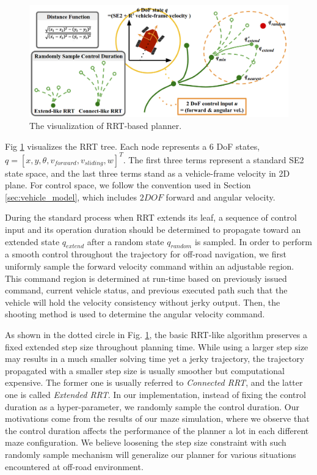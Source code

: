 \documentclass[../thesis.tex]{subfiles}
\begin{document}
\begin{figure}[t]
    	\begin{center}
    	 \centerline{\includegraphics[width=0.8\columnwidth]{./RRTPlanner/fig/rrt.png}}
           	\caption{The visualization of RRT-based planner.}
           	\label{fig:rrt}
    	\end{center}
\end{figure}
 
Fig \ref{fig:rrt} visualizes the RRT tree. Each node represents a $6$ DoF states, $q=[x,y, \theta ,v_{forward}, v_{sliding}, w]^T$. The first three terms represent a standard SE2 state space, and the last three terms stand as a vehicle-frame velocity in 2D plane. For control space, we follow the convention used in Section \ref{sec:vehicle_model}, which includes $2DOF$ forward and angular velocity.
 
During the standard process when RRT extends its leaf, a sequence of control input and its operation duration should be determined to propagate toward an extended state $q_{extend}$ after a random state $q_{random}$ is sampled.
In order to perform a smooth control throughout the trajectory for off-road navigation, we first uniformly sample the forward velocity command within an adjustable region.
This command region is determined at run-time based on previously issued command, current vehicle status, and previous executed path such that the vehicle will hold the velocity consistency without jerky output.
Then, the shooting method is used to determine the angular velocity command.
 
As shown in the dotted circle in Fig. \ref{fig:rrt}, the basic RRT-like algorithm preserves a fixed extended step size throughout planning time.
While using a larger step size may results in a much smaller solving time yet a jerky trajectory, the trajectory propagated with a smaller step size is usually smoother but computational expensive.
The former one is usually referred to \textit{Connected RRT}, and the latter one is called \textit{Extended RRT}.
In our implementation, instead of fixing the control duration as a hyper-parameter, we randomly sample the control duration.
Our motivations come from the results of our maze simulation, where we observe that the control duration affects the performance of the planner a lot in each different maze configuration.
We believe loosening the step size constraint with such randomly sample mechanism will generalize our planner for various situations encountered at off-road environment.
 
\end{document}

